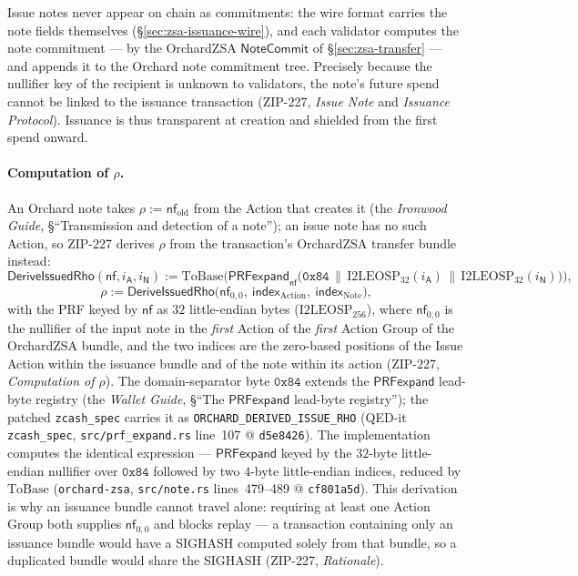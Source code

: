 \documentclass[11pt,a4paper]{article}
\theoremstyle{definition}
\newcommand{\nfsym}{\mathsf{nf}}
\newcommand{\NoteCommit}{\ensuremath{\mathsf{NoteCommit}}}
\begin{document}
Issue notes never appear on chain as commitments: the wire format carries
the note fields themselves (\S\ref{sec:zsa-issuance-wire}), and each
validator computes the note commitment --- by the OrchardZSA
$\NoteCommit$ of \S\ref{sec:zsa-transfer} --- and appends it to the
Orchard note commitment tree. Precisely because the nullifier key of the
recipient is unknown to validators, the note's future spend cannot be
linked to the issuance transaction (ZIP-227, \emph{Issue Note} and
\emph{Issuance Protocol}). Issuance is thus transparent at creation and
shielded from the first spend onward.

\paragraph{Computation of $\rho$.} An Orchard note takes
$\rho := \nfsym_{\mathrm{old}}$ from the Action that creates it (the
\emph{Ironwood Guide}, \S``Transmission and detection of a note'');
an issue note has no such Action, so ZIP-227 derives $\rho$ from the
transaction's OrchardZSA transfer bundle instead:
\[
\mathsf{DeriveIssuedRho}(\nfsym, i_{\mathsf{A}}, i_{\mathsf{N}}) :=
\mathrm{ToBase}\bigl(\mathsf{PRFexpand}_{\nfsym}\bigl(
\mathtt{0x84} \,\|\, \mathrm{I2LEOSP}_{32}(i_{\mathsf{A}}) \,\|\,
\mathrm{I2LEOSP}_{32}(i_{\mathsf{N}})\bigr)\bigr),
\]
\[
\rho := \mathsf{DeriveIssuedRho}\bigl(\nfsym_{0,0},\
\mathsf{index}_{\mathrm{Action}},\ \mathsf{index}_{\mathrm{Note}}\bigr),
\]
with the PRF keyed by $\nfsym$ as $32$ little-endian bytes
($\mathrm{I2LEOSP}_{256}$),
where $\nfsym_{0,0}$ is the nullifier of the input note in the
\emph{first} Action of the \emph{first} Action Group of the OrchardZSA
bundle, and the two indices are the zero-based positions of the Issue
Action within the issuance bundle and of the note within its action
(ZIP-227, \emph{Computation of $\rho$}). The domain-separator byte
$\mathtt{0x84}$ extends the $\mathsf{PRFexpand}$ lead-byte registry (the
\emph{Wallet Guide}, \S``The $\mathsf{PRFexpand}$ lead-byte registry'');
the patched \texttt{zcash\_spec} carries it as
\texttt{ORCHARD\_DERIVED\_ISSUE\_RHO} (QED-it \texttt{zcash\_spec},
\texttt{src/prf\_expand.rs} line~107 @ \texttt{d5e8426}). The
implementation computes the identical expression --- $\mathsf{PRFexpand}$
keyed by the $32$-byte little-endian nullifier over
$\mathtt{0x84}$ followed by two $4$-byte little-endian indices, reduced by
$\mathrm{ToBase}$ (\texttt{orchard-zsa}, \texttt{src/note.rs}
lines~479--489 @ \texttt{cf801a5d}). This derivation is why an issuance
bundle cannot travel alone: requiring at least one Action Group both
supplies $\nfsym_{0,0}$ and blocks replay --- a transaction containing
only an issuance bundle would have a SIGHASH computed solely from that
bundle, so a duplicated bundle would share the SIGHASH (ZIP-227,
\emph{Rationale}).
\end{document}
